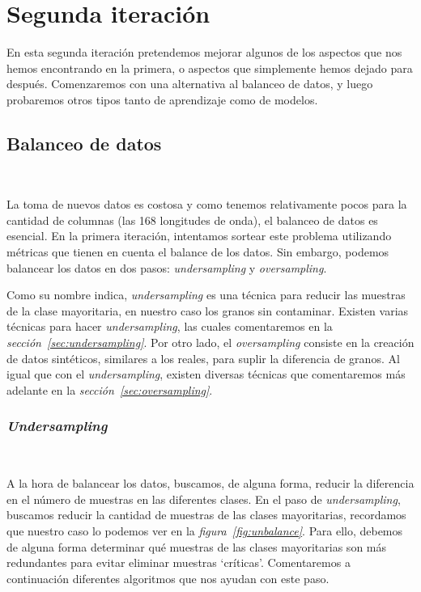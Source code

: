 \section{Segunda iteración}

En esta segunda iteración pretendemos mejorar algunos de los aspectos que nos hemos encontrando en la primera, o aspectos que simplemente hemos dejado para después. Comenzaremos con una alternativa al balanceo de
datos, y luego probaremos otros tipos tanto de aprendizaje como de modelos.

\subsection{Balanceo de datos}\ \label{sec:i2-balance}

La toma de nuevos datos es costosa y como tenemos relativamente pocos para la cantidad de columnas (las 168 longitudes de onda), el balanceo de datos es esencial. En la primera iteración, intentamos sortear este problema utilizando 
métricas que tienen en cuenta el balance de los datos. Sin embargo, podemos balancear los datos en dos pasos: \textit{undersampling} y \textit{oversampling}. 

Como su nombre indica, \textit{undersampling} es una técnica para reducir las muestras de la clase mayoritaria, en nuestro caso los granos sin contaminar. Existen varias técnicas para hacer \textit{undersampling}, las cuales 
comentaremos en la \textit{sección\ \ref{sec:undersampling}}. Por otro lado, el \textit{oversampling} consiste en la creación de datos sintéticos, similares a los reales, para suplir la diferencia de granos. Al igual que con el 
\textit{undersampling}, existen diversas técnicas que comentaremos más adelante en la \textit{sección\ \ref{sec:oversampling}}.


\subsubsection{\textit{Undersampling}}\ \label{sec:undersampling}

A la hora de balancear los datos, buscamos, de alguna forma, reducir la diferencia en el número de muestras en las diferentes clases. En el paso de \textit{undersampling}, buscamos reducir la cantidad de muestras de las clases
mayoritarias, recordamos que nuestro caso lo podemos ver en la \textit{figura\ \ref{fig:unbalance}}. Para ello, debemos de alguna forma determinar qué muestras de las clases mayoritarias son más redundantes para evitar eliminar
muestras `críticas'. Comentaremos a continuación diferentes algoritmos que nos ayudan con este paso.

